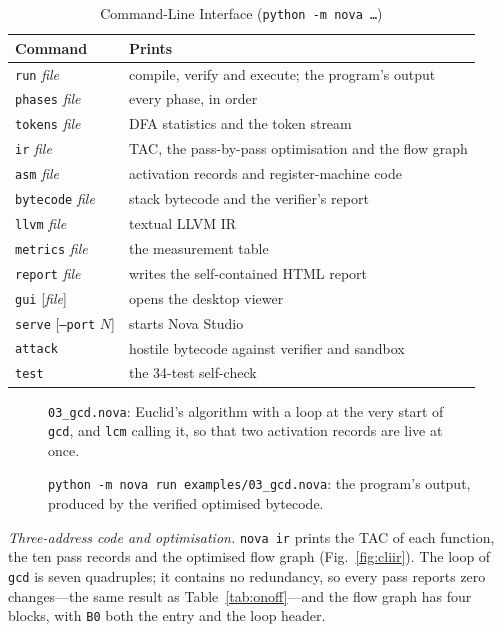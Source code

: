 \documentclass[conference]{IEEEtran}
\newcommand{\code}[1]{\texttt{#1}}
\begin{document}
\begin{table}[!tbp]
\caption{Command-Line Interface (\code{python -m nova \ldots})}
\label{tab:cli}
\centering
\footnotesize
\setlength{\tabcolsep}{3.5pt}
\begin{tabular}{@{}l L{5.0cm}@{}}
\toprule
Command & Prints \\
\midrule
\code{run} \emph{file} & compile, verify and execute; the program's output \\
\code{phases} \emph{file} & every phase, in order \\
\code{tokens} \emph{file} & DFA statistics and the token stream \\
\code{ir} \emph{file} & TAC, the pass-by-pass optimisation and the flow graph \\
\code{asm} \emph{file} & activation records and register-machine code \\
\code{bytecode} \emph{file} & stack bytecode and the verifier's report \\
\code{llvm} \emph{file} & textual LLVM IR \\
\code{metrics} \emph{file} & the measurement table \\
\code{report} \emph{file} & writes the self-contained HTML report \\
\code{gui} [\emph{file}] & opens the desktop viewer \\
\code{serve} [\code{--port} $N$] & starts Nova Studio \\
\code{attack} & hostile bytecode against verifier and sandbox \\
\code{test} & the 34-test self-check \\
\bottomrule
\end{tabular}
\end{table}

\begin{figure}[!tbp]

\caption{\code{03\_gcd.nova}: Euclid's algorithm with a loop at the very start of \code{gcd}, and \code{lcm} calling it, so that two activation records are live at once.}
\label{fig:gcdsrc}
\end{figure}

\begin{figure}[!tbp]

\caption{\code{python -m nova run examples/03\_gcd.nova}: the program's output, produced by the verified optimised bytecode.}
\label{fig:clirun}
\end{figure}

\emph{Three-address code and optimisation.} \code{nova ir} prints the TAC of each function, the ten pass records and the optimised flow graph (Fig.~\ref{fig:cliir}). The loop of \code{gcd} is seven quadruples; it contains no redundancy, so every pass reports zero changes---the same result as Table~\ref{tab:onoff}---and the flow graph has four blocks, with \code{B0} both the entry and the loop header.
\end{document}
